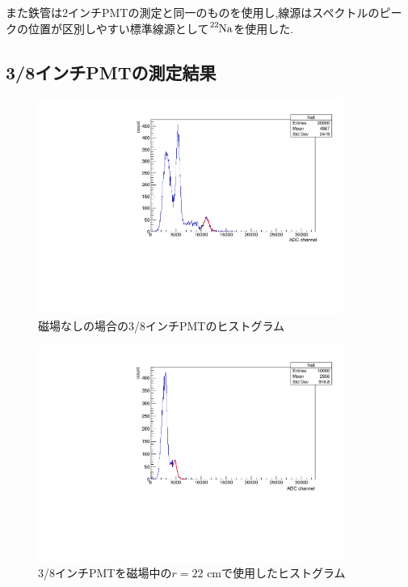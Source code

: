 また鉄管は2インチPMTの測定と同一のものを使用し,線源はスペクトルのピークの位置が区別しやすい標準線源として$\ce{^{22}Na}$を使用した.


\subsection{3/8インチPMTの測定結果}

\begin{figure}[tbp]
	\centering
		\includegraphics[angle=-90,width=10cm]{fig/iguchi/minicoincidence2.pdf}
	\caption{磁場なしの場合の3/8インチPMTのヒストグラム}
	\label{histminicoincidence2}
\end{figure}

\begin{figure}[tbp]
	\centering
		\includegraphics[angle=-90,width=10cm]{fig/iguchi/minicoout22.pdf}
	\caption{3/8インチPMTを磁場中の$r=22$ cmで使用したヒストグラム}
	\label{histminicoout22}
\end{figure}

